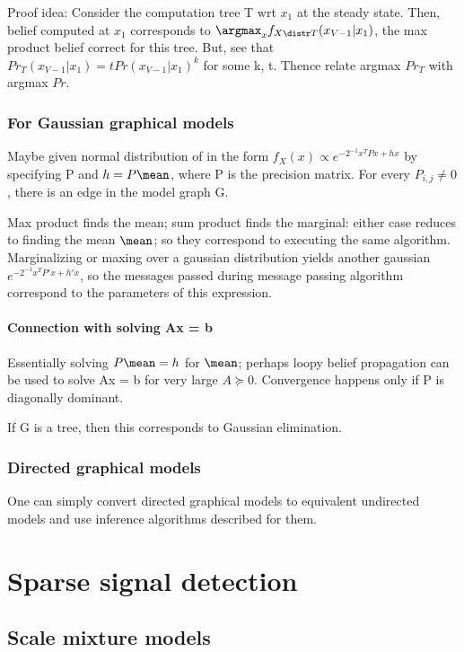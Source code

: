 \documentclass[oneside, article]{memoir}
\begin{document}
Proof idea: Consider the computation tree T wrt $x_1$ at the steady state. Then, belief computed at $x_1$ corresponds to $\argmax_x f_{X \distr T}(x_{V-1}|x_1)$, the max product belief correct for this tree. But, see that \\
$Pr_{T}(x_{V-1}|x_1) =  t Pr(x_{V-1}|x_1)^{k}$ for some k, t. Thence relate argmax $Pr_{T}$ with argmax $Pr$.

\subsection{For Gaussian graphical models}
Maybe given normal distribution of in the form $f_X(x) \propto e^{-2^{-1}x^{T}Px + hx}$ by specifying P and $h = P \mean$, where P is the precision matrix. For every $P_{i,j} \neq 0$, there is an edge in the model graph G.

Max product finds the mean; sum product finds the marginal: either case reduces to finding the mean $\mean$; so they correspond to executing the same algorithm. Marginalizing or maxing over a gaussian distribution yields another gaussian $e^{-2^{-1}x^{T}P'x + h'x}$, so the messages passed during message passing algorithm correspond to the parameters of this expression.

\subsubsection{Connection with solving Ax = b}
Essentially solving $P\mean = h$ for $\mean$; perhaps loopy belief propagation can be used to solve Ax = b for very large $A \succeq 0$. Convergence happens only if P is diagonally dominant.

If G is a tree, then this corresponds to Gaussian elimination.

\subsection{Directed graphical models}
One can simply convert directed graphical models to equivalent undirected models and use inference algorithms described for them.

\chapter{Sparse signal detection}
\section{Scale mixture models}
\tbc
\end{document}
